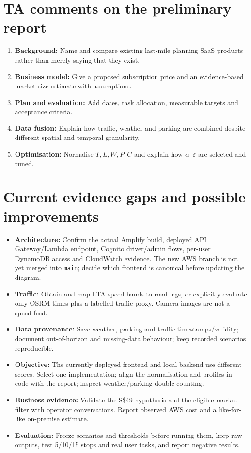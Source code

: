 \documentclass[11pt,a4paper]{article}
\begin{document}
\section{TA comments on the preliminary report}
\begin{enumerate}
  \item \textbf{Background:} Name and compare existing last-mile planning SaaS products rather than merely saying that they exist.
  \item \textbf{Business model:} Give a proposed subscription price and an evidence-based market-size estimate with assumptions.
  \item \textbf{Plan and evaluation:} Add dates, task allocation, measurable targets and acceptance criteria.
  \item \textbf{Data fusion:} Explain how traffic, weather and parking are combined despite different spatial and temporal granularity.
  \item \textbf{Optimisation:} Normalise $T,L,W,P,C$ and explain how $\alpha$--$\varepsilon$ are selected and tuned.
\end{enumerate}

\section{Current evidence gaps and possible improvements}
\begin{itemize}
  \item \textbf{Architecture:} Confirm the actual Amplify build, deployed API Gateway/Lambda endpoint, Cognito driver/admin flows, per-user DynamoDB access and CloudWatch evidence. The new AWS branch is not yet merged into \texttt{main}; decide which frontend is canonical before updating the diagram.
  \item \textbf{Traffic:} Obtain and map LTA speed bands to road legs, or explicitly evaluate only OSRM times plus a labelled traffic proxy. Camera images are not a speed feed.
  \item \textbf{Data provenance:} Save weather, parking and traffic timestamps/validity; document out-of-horizon and missing-data behaviour; keep recorded scenarios reproducible.
  \item \textbf{Objective:} The currently deployed frontend and local backend use different scores. Select one implementation; align the normalisation and profiles in code with the report; inspect weather/parking double-counting.
  \item \textbf{Business evidence:} Validate the S\$49 hypothesis and the eligible-market filter with operator conversations. Report observed AWS cost and a like-for-like on-premise estimate.
  \item \textbf{Evaluation:} Freeze scenarios and thresholds before running them, keep raw outputs, test 5/10/15 stops and real user tasks, and report negative results.
\end{itemize}
\end{document}
